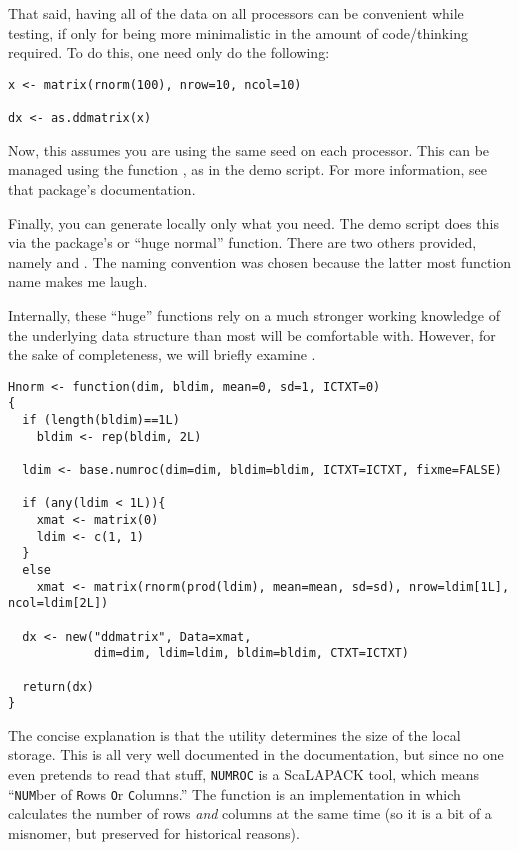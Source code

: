 That said, having all of the data on all processors can be convenient while testing, if only for being more minimalistic in the amount of code/thinking required.  To do this, one need only do the following:

\begin{lstlisting}[language=rr]
x <- matrix(rnorm(100), nrow=10, ncol=10)

dx <- as.ddmatrix(x)
\end{lstlisting}

Now, this assumes you are using the same seed on each processor.  This can be managed using the  function , as in the demo script.  For more information, see that package's documentation.

Finally, you can generate locally only what you need.  The demo script does this via the  package's  or ``huge normal'' function.  There are two others provided, namely  and .  The naming convention was chosen because the latter most function name makes me laugh.

Internally, these ``huge'' functions rely on a much stronger working knowledge of the underlying data structure than most will be comfortable with.  However, for the sake of completeness, we will briefly examine .

\begin{lstlisting}[language=rr,title=Hnrom()]
Hnorm <- function(dim, bldim, mean=0, sd=1, ICTXT=0)
{
  if (length(bldim)==1L)
    bldim <- rep(bldim, 2L)
  
  ldim <- base.numroc(dim=dim, bldim=bldim, ICTXT=ICTXT, fixme=FALSE)
    
  if (any(ldim < 1L)){
    xmat <- matrix(0)
    ldim <- c(1, 1)
  }
  else
    xmat <- matrix(rnorm(prod(ldim), mean=mean, sd=sd), nrow=ldim[1L], ncol=ldim[2L])
              
  dx <- new("ddmatrix", Data=xmat,
            dim=dim, ldim=ldim, bldim=bldim, CTXT=ICTXT)
            
  return(dx)
}
\end{lstlisting}

The concise explanation is that the  utility determines the size of the local storage.  This is all very well documented in the  documentation, but since no one even pretends to read that stuff, \texttt{NUMROC} is a ScaLAPACK tool, which means ``\texttt{NUM}ber of \texttt{R}ows \texttt{O}r \texttt{C}olumns.''  The function  is an implementation in  which calculates the number of rows \emph{and} columns at the same time (so it is a bit of a misnomer, but preserved for historical reasons).  

